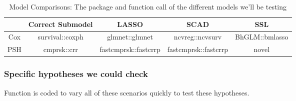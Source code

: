 \documentclass[11pt,a4paper]{article}
\begin{document}
\begin{table}[h]
    \centering
    \begin{tabular}{| c || c | c | c | c |}
    \hline
         & Correct Submodel & LASSO & SCAD & SSL \\
         \hline \hline
        Cox & survival::coxph & glmnet::glmnet & ncvreg::ncvsurv & BhGLM::bmlasso \\
        \hline
        PSH & cmprsk::crr & fastcmprsk::fastcrrp & fastcmprsk::fastcrrp & novel \\
        \hline
    \end{tabular}
    \caption{Model Comparisons: The package and function call of the different models we'll be testing}
    \label{tab:mods}
\end{table}

\subsubsection{Specific hypotheses we could check}
Function is coded to vary all of these scenarios quickly to test these hypotheses. 
\end{document}
